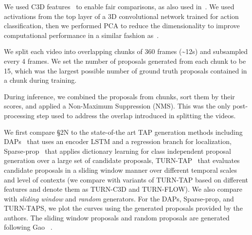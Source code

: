 \documentclass[10pt,journal,compsoc]{IEEEtran}
\begin{document}


 We used C3D features~\cite{tran2015learning}  to enable fair comparisons, as also used in~\cite{buch2017sst,escorcia2016daps}. We used activations from the top layer of a 3D convolutional network trained for action classification, then we performed PCA to reduce the dimensionality to improve computational performance in a similar fashion as~\cite{escorcia2016daps}.





We split each video into overlapping chunks of 360 frames (\textasciitilde 12s) and subsampled every 4 frames. We set the number of proposals generated from each chunk to be 15, which was the largest possible number of ground truth proposals contained in a chunk during training. 

During inference, we combined the proposals from chunks, sort them by their scores, and applied a Non-Maximum Suppression (NMS). This was the only post-processing step used to address the overlap introduced in splitting the videos. 


We first compare \S2N to the state-of-the art TAP generation methods including DAPs~\cite{escorcia2016daps} that uses an encoder LSTM and a regression branch for localization, Sparse-prop~\cite{caba2016fast} that applies dictionary learning for class independent proposal generation over a large set of candidate proposals, TURN-TAP~\cite{Gao_2017_ICCV} that evaluates candidate proposals in a sliding window manner over different temporal scales and level of contexts (we compare with variants of TURN-TAP based on different features and denote them as TURN-C3D and TURN-FLOW). We also compare with \textit{sliding window} and \textit{random} generators. For the DAPs, Sparse-prop, and TURN-TAPS, we plot the curves using the generated proposals provided by the authors. The sliding window proposals and random proposals are generated following Gao \etal~\cite{Gao_2017_ICCV}.
\end{document}
